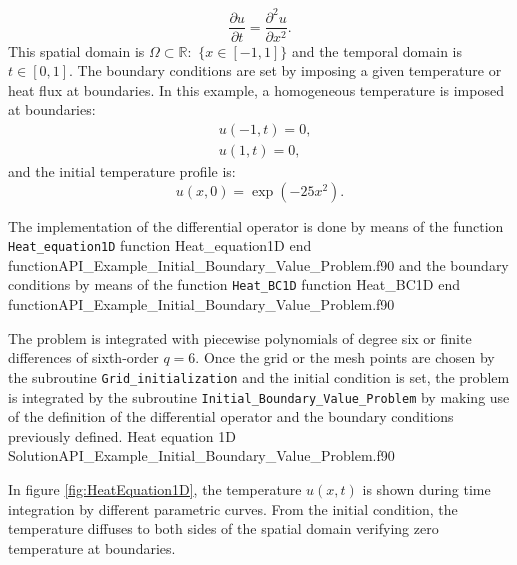       \begin{equation*}      	
      \frac{\partial u}{\partial t} =  \frac{\partial^2 u}{\partial x^2}.
      \end{equation*}
This spatial domain is $\Omega \subset \mathbb{R} : $ $\{x\in  [-1,1]\}$ and the temporal domain is $t \in [0,1]$.      
The boundary conditions are set by imposing a given temperature or heat flux at boundaries. In this example, a homogeneous temperature is  imposed at boundaries:
      \begin{align*}      	
       & u(-1,t)=0, \\
       & u(1,t)=0,
      \end{align*}
and the initial temperature profile is:
      \begin{equation*}      	
      u(x,0)=\exp(-25 x^2).
      \end{equation*}
      
      
The implementation of the differential operator is done by means of the function \verb|Heat_equation1D|
      \vspace{0.2cm} 
      {function Heat_equation1D}
      {end function}{API_Example_Initial_Boundary_Value_Problem.f90}
and  the boundary conditions by means of the function \verb|Heat_BC1D|
      \vspace{0.2cm} 
      {function Heat_BC1D}
      {end function}{API_Example_Initial_Boundary_Value_Problem.f90}
      
The problem is integrated with piecewise polynomials of degree six or finite differences of sixth-order $q=6$.  Once the grid or the mesh points are chosen by the subroutine \verb|Grid_initialization| and the initial condition is set, the problem is integrated by the subroutine
\verb|Initial_Boundary_Value_Problem| by making use of the definition of the differential operator and the boundary conditions previously defined.
      \vspace{0.5cm} 
      {Heat equation 1D}
      {Solution}{API_Example_Initial_Boundary_Value_Problem.f90}

In figure \ref{fig:HeatEquation1D}, the temperature $ u(x,t) $ is shown during time integration by different parametric curves. 
From the initial condition, the temperature diffuses to both sides of the spatial domain verifying zero temperature at boundaries. 

